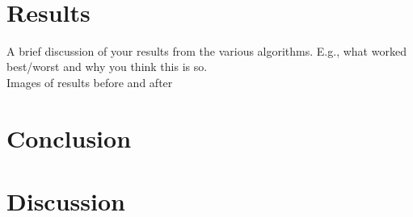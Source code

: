 \documentclass[11pt]{article}
\begin{document}
\begin{page}
\\


\section{Results}
A brief discussion of your results from the various algorithms. E.g., what worked best/worst
and why you think this is so.\\

Images of results before and after\\

\section{Conclusion}


\section{Discussion}

\end{page}
\end{document}
